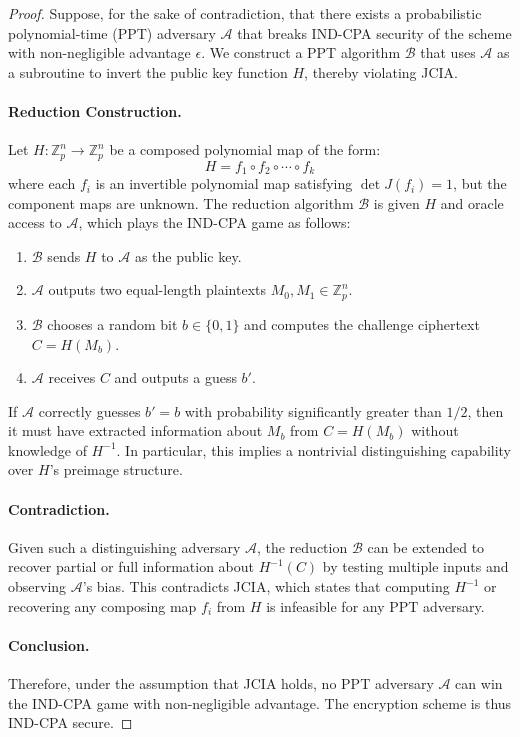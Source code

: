\documentclass[12pt]{article}
\begin{document}
\begin{proof}
Suppose, for the sake of contradiction, that there exists a probabilistic polynomial-time (PPT) adversary \( \mathcal{A} \) that breaks IND-CPA security of the scheme with non-negligible advantage \( \epsilon \). We construct a PPT algorithm \( \mathcal{B} \) that uses \( \mathcal{A} \) as a subroutine to invert the public key function \( H \), thereby violating JCIA.

\paragraph{Reduction Construction.}
Let \( H : \mathbb{Z}_p^n \rightarrow \mathbb{Z}_p^n \) be a composed polynomial map of the form:
\[
H = f_1 \circ f_2 \circ \cdots \circ f_k
\]
where each \( f_i \) is an invertible polynomial map satisfying \( \det J(f_i) = 1 \), but the component maps are unknown. The reduction algorithm \( \mathcal{B} \) is given \( H \) and oracle access to \( \mathcal{A} \), which plays the IND-CPA game as follows:

\begin{enumerate}
    \item \( \mathcal{B} \) sends \( H \) to \( \mathcal{A} \) as the public key.
    \item \( \mathcal{A} \) outputs two equal-length plaintexts \( M_0, M_1 \in \mathbb{Z}_p^n \).
    \item \( \mathcal{B} \) chooses a random bit \( b \in \{0,1\} \) and computes the challenge ciphertext \( C = H(M_b) \).
    \item \( \mathcal{A} \) receives \( C \) and outputs a guess \( b' \).
\end{enumerate}

If \( \mathcal{A} \) correctly guesses \( b' = b \) with probability significantly greater than \( 1/2 \), then it must have extracted information about \( M_b \) from \( C = H(M_b) \) without knowledge of \( H^{-1} \). In particular, this implies a nontrivial distinguishing capability over \( H \)'s preimage structure.

\paragraph{Contradiction.}
Given such a distinguishing adversary \( \mathcal{A} \), the reduction \( \mathcal{B} \) can be extended to recover partial or full information about \( H^{-1}(C) \) by testing multiple inputs and observing \( \mathcal{A} \)'s bias. This contradicts JCIA, which states that computing \( H^{-1} \) or recovering any composing map \( f_i \) from \( H \) is infeasible for any PPT adversary.

\paragraph{Conclusion.}
Therefore, under the assumption that JCIA holds, no PPT adversary \( \mathcal{A} \) can win the IND-CPA game with non-negligible advantage. The encryption scheme is thus IND-CPA secure.
\end{proof}
\end{document}
